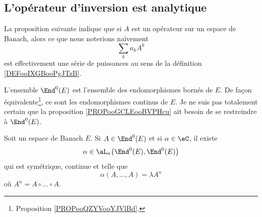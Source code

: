 \subsection{L'opérateur d'inversion est analytique}

La proposition suivante indique que si \( A\) est un opérateur sur un espace de Banach, alors ce que nous noterions naïvement
\begin{equation}
	\sum_ka_kA^k
\end{equation}
est effectivement une série de puissances au sens de la définition \ref{DEFooIXGBooPgJTzB}.

L'ensemble \( \End^0(E)\) est l'ensemble des endomorphismes bornés de \( E\). De façon équivalente\footnote{Proposition \ref{PROPooQZYVooYJVlBd}.}, ce sont les endomorphismes continus de \( E\). Je ne suis pas totalement certain que la proposition \ref{PROPooGCLEooBVPHcu} ait besoin de se restreindre à \( \End^0(E)\).

\begin{proposition}	\label{PROPooGCLEooBVPHcu}
	Soit un espace de Banach \( E\). Si \( A\in \End^0(E)\) et si \( \alpha\in\eC \), il existe
	\begin{equation}
		\alpha\in\aL_n\big( \End^0(E),\End^0(E) \big)
	\end{equation}
	qui est symétrique, continue et telle que
	\begin{equation}
		\alpha(A,\ldots,A)=\lambda A^n
	\end{equation}
	où \( A^n=A\circ\ldots\circ A\).
\end{proposition}

